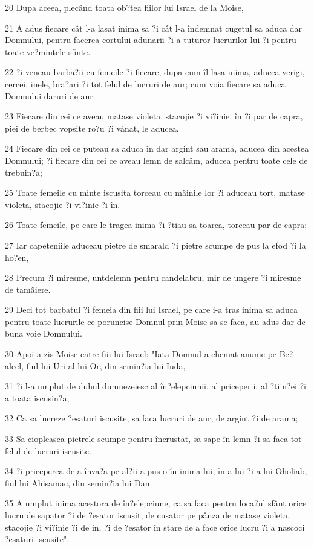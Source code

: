 \par 20 Dupa aceea, plecând toata ob?tea fiilor lui Israel de la Moise,
\par 21 A adus fiecare cât l-a lasat inima sa ?i cât l-a îndemnat cugetul sa aduca dar Domnului, pentru facerea cortului adunarii ?i a tuturor lucrurilor lui ?i pentru toate ve?mintele sfinte.
\par 22 ?i veneau barba?ii cu femeile ?i fiecare, dupa cum îl lasa inima, aducea verigi, cercei, inele, bra?ari ?i tot felul de lucruri de aur; cum voia fiecare sa aduca Domnului daruri de aur.
\par 23 Fiecare din cei ce aveau matase violeta, stacojie ?i vi?inie, în ?i par de capra, piei de berbec vopsite ro?u ?i vânat, le aducea.
\par 24 Fiecare din cei ce puteau sa aduca în dar argint sau arama, aducea din acestea Domnului; ?i fiecare din cei ce aveau lemn de salcâm, aducea pentru toate cele de trebuin?a;
\par 25 Toate femeile cu minte iscusita torceau cu mâinile lor ?i aduceau tort, matase violeta, stacojie ?i vi?inie ?i în.
\par 26 Toate femeile, pe care le tragea inima ?i ?tiau sa toarca, torceau par de capra;
\par 27 Iar capeteniile aduceau pietre de smarald ?i pietre scumpe de pus la efod ?i la ho?en,
\par 28 Precum ?i miresme, untdelemn pentru candelabru, mir de ungere ?i miresme de tamâiere.
\par 29 Deci tot barbatul ?i femeia din fiii lui Israel, pe care i-a tras inima sa aduca pentru toate lucrurile ce poruncise Domnul prin Moise sa se faca, au adus dar de buna voie Domnului.
\par 30 Apoi a zis Moise catre fiii lui Israel: "Iata Domnul a chemat anume pe Be?aleel, fiul lui Uri al lui Or, din semin?ia lui Iuda,
\par 31 ?i l-a umplut de duhul dumnezeiesc al în?elepciunii, al priceperii, al ?tiin?ei ?i a toata iscusin?a,
\par 32 Ca sa lucreze ?esaturi iscusite, sa faca lucruri de aur, de argint ?i de arama;
\par 33 Sa ciopleasca pietrele scumpe pentru încrustat, sa sape în lemn ?i sa faca tot felul de lucruri iscusite.
\par 34 ?i priceperea de a înva?a pe al?ii a pus-o în inima lui, în a lui ?i a lui Oholiab, fiul lui Ahisamac, din semin?ia lui Dan.
\par 35 A umplut inima acestora de în?elepciune, ca sa faca pentru loca?ul sfânt orice lucru de sapator ?i de ?esator iscusit, de cusator pe pânza de matase violeta, stacojie ?i vi?inie ?i de in, ?i de ?esator în stare de a face orice lucru ?i a nascoci ?esaturi iscusite".

